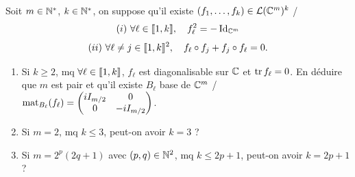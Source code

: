 
\begin{statementbox}
Soit $m\in\mathbb N^*$, $k\in\mathbb N^*$, on suppose qu'il existe
$(f_1,\dots,f_k)\in\mathcal L(\mathbb C^m)^k$ /
\[
(i)\ \forall \ell\in\llbracket 1,k\rrbracket,\quad f_\ell^2=-\operatorname{Id}_{\mathbb C^m}
\]
\[
(ii)\ \forall \ell\neq j\in\llbracket 1,k\rrbracket^2,\quad
f_\ell\circ f_j+f_j\circ f_\ell=0.
\]
\begin{enumerate}[label=\alph*)]
  \item Si $k\geq2$, mq $\forall \ell\in\llbracket 1,k\rrbracket$, $f_\ell$ est
  diagonalisable sur $\mathbb C$ et $\operatorname{tr} f_\ell=0$. En déduire que $m$ est pair et
  qu'il existe $B_\ell$ base de $\mathbb C^m$ /
  $\operatorname{mat}_{B_\ell}(f_\ell)=\begin{pmatrix}iI_{m/2}&0\\0&-iI_{m/2}\end{pmatrix}$.
  \item Si $m=2$, mq $k\leq3$, peut-on avoir $k=3$ ?
  \item Si $m=2^p(2q+1)$ avec $(p,q)\in\mathbb N^2$, mq $k\leq2p+1$, peut-on avoir
  $k=2p+1$ ?
\end{enumerate}
\end{statementbox}

